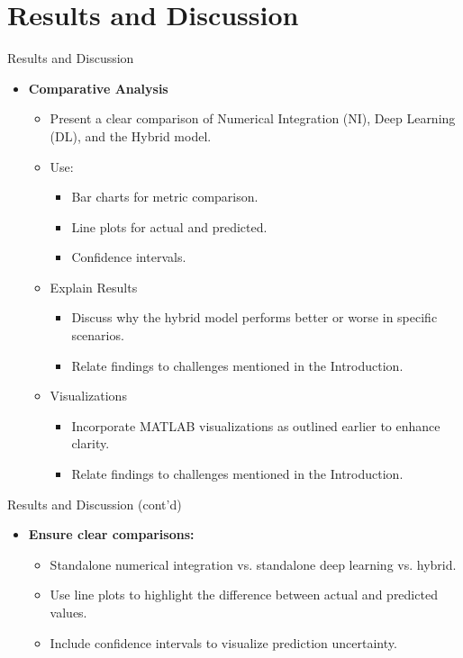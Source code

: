 \documentclass[pt]{beamer}
\newenvironment{tres important}[2][]{
	\setkeys{EmphEqEnv}{#2}
	\setkeys{EmphEqOpt}{box={\setlength{\fboxsep}{10pt}\fcolorbox{myNewColorA}{white}},#1}
	\EmphEqMainEnv}
{\endEmphEqMainEnv}
\begin{document}
\section{Results and Discussion}

\begin{frame}{Results and Discussion}
\begin{itemize}
    \item \textbf{Comparative Analysis}
    \begin{itemize}
        \item Present a clear comparison of Numerical Integration (NI), Deep Learning (DL), and the Hybrid model.
        \item Use:
        \begin{itemize}
            \item Bar charts for metric comparison.
            \item Line plots for actual and predicted.
            \item Confidence intervals.
        \end{itemize}
        \item Explain Results
            \begin{itemize}
            \item Discuss why the hybrid model performs better or worse in specific scenarios.
            \item Relate findings to challenges mentioned in the Introduction.
            \end{itemize}
        \item Visualizations
            \begin{itemize}
            \item Incorporate MATLAB visualizations as outlined earlier to enhance clarity.
            \item Relate findings to challenges mentioned in the Introduction.
            \end{itemize}
    \end{itemize}
\end{itemize}
\end{frame}

\begin{frame}{Results and Discussion (cont'd)}
    \begin{itemize}
    \item \textbf{Ensure clear comparisons:}
        \begin{itemize}
            \item Standalone numerical integration vs. standalone deep learning vs. hybrid.
            \item Use line plots to highlight the difference between actual and predicted values.
            \item Include confidence intervals to visualize prediction uncertainty.
        \end{itemize}
    \end{itemize}
\end{frame}
\end{document}
